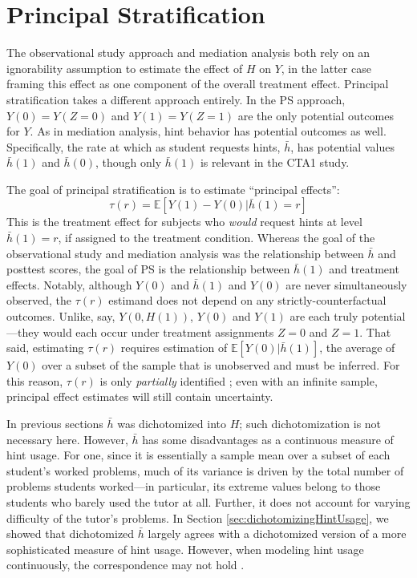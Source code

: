 \documentclass{article}\usepackage[]{graphicx}\usepackage[]{color}
\newcommand{\EE}{\mathbb{E}}
\begin{document}
\section{Principal Stratification}\label{sec:principalStratification}
The observational study approach and mediation analysis both rely on
an ignorability assumption to estimate the effect of $H$ on $Y$, in
the latter case framing this effect as one component of the overall
treatment effect.
Principal stratification \citep[PS;][]{frangakis} takes a different approach entirely.
In the PS approach, $Y(0)=Y(Z=0)$ and $Y(1)=Y(Z=1)$ are the only potential
outcomes for $Y$.
As in mediation analysis, hint behavior has potential outcomes as
well.
Specifically, the rate at which as student requests hints, $\bar{h}$,
has potential values $\bar{h}(1)$ and $\bar{h}(0)$,
though only $\bar{h}(1)$ is relevant in the CTA1 study.

The goal of principal stratification is to estimate ``principal
effects'':
\begin{equation*}
\tau(r)=\EE[Y(1)-Y(0)|\bar{h}(1)=r]
\end{equation*}
This is the treatment effect for subjects who \emph{would} request
hints at level $\bar{h}(1)=r$, if assigned to the treatment condition.
Whereas the goal of the observational study and mediation
analysis was the relationship between $\bar{h}$ and posttest scores, the
goal of PS is the relationship between $\bar{h}(1)$ and treatment effects.
Notably, although $Y(0)$ and $\bar{h}(1)$ and $Y(0)$ are never
simultaneously observed, the $\tau(r)$ estimand does not depend on any
strictly-counterfactual outcomes.
Unlike, say, $Y(0,H(1))$, $Y(0)$ and $Y(1)$ are each truly
potential---they would each occur under treatment assignments $Z=0$
and $Z=1$.
That said, estimating $\tau(r)$ requires estimation of
$\EE[Y(0)|\bar{h}(1)]$, the average of $Y(0)$ over a subset of the
sample that is unobserved and must be inferred.
For this reason, $\tau(r)$ is only \emph{partially} identified
\citep[e.g.][]{mealli2016identification}; even with an infinite
sample, principal effect estimates will still contain uncertainty.

In previous sections $\bar{h}$ was dichotomized into $H$; such
dichotomization is not necessary here.
However, $\bar{h}$ has some disadvantages as a continuous measure of
hint usage.
For one, since it is essentially a sample mean over a subset of each student's
worked problems, much of its variance is driven by the total number of
problems students worked---in particular, its extreme values belong to
those students who barely used the tutor at all.
Further, it does not account for varying difficulty of the tutor's
problems.
In Section \ref{sec:dichotomizingHintUsage}, we showed that
dichotomized $\bar{h}$ largely agrees with a dichotomized version of a
more sophisticated measure of hint usage.
However, when modeling hint usage continuously, the correspondence may
not hold \citep[see][for a more complete discussion]{aoas}.
\end{document}
